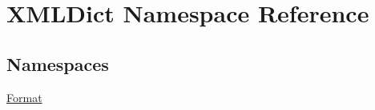 \hypertarget{namespaceXMLDict}{}\section{X\+M\+L\+Dict Namespace Reference}
\label{namespaceXMLDict}
\subsection*{Namespaces}
\begin{DoxyCompactItemize}
\item 
 \hyperlink{namespaceXMLDict_1_1Format}{Format}
\end{DoxyCompactItemize}
